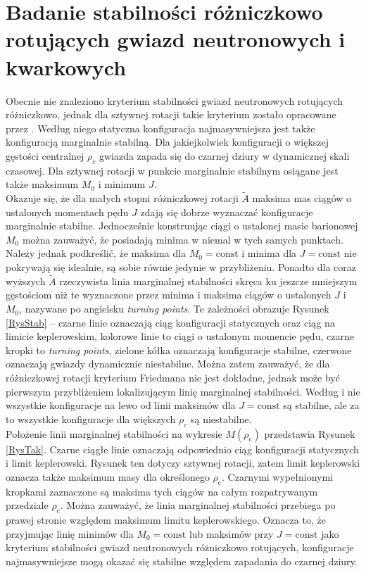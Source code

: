 \documentclass{bachelor_thesis}
\begin{document}
    \section{Badanie stabilności różniczkowo rotujących gwiazd neutronowych i kwarkowych}
        Obecnie nie znaleziono kryterium stabilności gwiazd neutronowych rotujących różniczkowo, jednak dla sztywnej rotacji takie kryterium zostało opracowane przez \cite{Friedman1988}. Według niego statyczna konfiguracja najmasywniejsza jest także konfiguracją marginalnie stabilną. Dla jakiejkolwiek konfiguracji o większej gęstości centralnej $\rho_c$ gwiazda zapada się do czarnej dziury w dynamicznej skali czasowej. Dla sztywnej rotacji w punkcie marginalnie stabilnym osiągane jest także maksimum $M_0$ i minimum $J$.\\
        \indent Okazuje się, że dla małych stopni różniczkowej rotacji $\tilde{A}$ maksima mas ciągów o ustalonych momentach pędu $J$ zdają się dobrze wyznaczać konfiguracje marginalnie stabilne. Jednocześnie konstruując ciągi o ustalonej masie barionowej $M_0$ można zauważyć, że posiadają minima w niemal w tych samych punktach. Należy jednak podkreślić, że maksima dla $M_0=\textrm{const}$ i minima dla $J=\textrm{const}$ nie pokrywają się idealnie, są sobie równie jedynie w przybliżeniu. Ponadto dla coraz wyższych $\tilde{A}$ rzeczywista linia marginalnej stabilności skręca ku jeszcze mniejszym gęstościom niż te wyznaczone przez minima i maksima ciągów o ustalonych $J$ i $M_0$, nazywane po angielsku \textit{turning points}. Te zależności obrazuje Rysunek \ref{RysStab} -- czarne linie oznaczają ciąg konfiguracji statycznych oraz ciąg na limicie keplerowskim, kolorowe linie to ciągi o ustalonym momencie pędu, czarne kropki to \textit{turning points}, zielone kółka oznaczają konfiguracje stabilne, czerwone oznaczają gwiazdy dynamicznie niestabilne. Można zatem zauważyć, że dla różniczkowej rotacji kryterium Friedmana nie jest dokładne, jednak może być pierwszym przybliżeniem lokalizującym linię marginalnej stabilności. Według \cite{Giacomazzo2011} i \cite{Weih2018} nie wszystkie konfiguracje na lewo od linii maksimów dla $J=\textrm{const}$ są stabilne, ale za to wszystkie konfiguracje dla większych $\rho_c$ są niestabilne. \\
        \indent Położenie linii marginalnej stabilności na wykresie $M(\rho_\textrm{c})$ przedstawia Rysunek \ref{RysTak}.  Czarne ciągłe linie oznaczają odpowiednio ciąg konfiguracji statycznych i limit keplerowski. Rysunek ten dotyczy sztywnej rotacji, zatem limit keplerowski oznacza także maksimum masy dla określonego $\rho_\textrm{c}$. Czarnymi wypełnionymi kropkami zaznaczone są maksima tych ciągów na całym rozpatrywanym przedziale $\rho_\textrm{c}$. Można zauważyć, że linia marginalnej stabilności przebiega po prawej stronie względem maksimum limitu keplerowskiego. Oznacza to, że przyjmując linię minimów dla $M_0=\textrm{const}$ lub maksimów przy $J=\textrm{const}$ jako kryterium stabilności gwiazd neutronowych różniczkowo rotujących, konfiguracje najmasywniejsze mogą okazać się stabilne względem zapadania do czarnej dziury.
\end{document}
